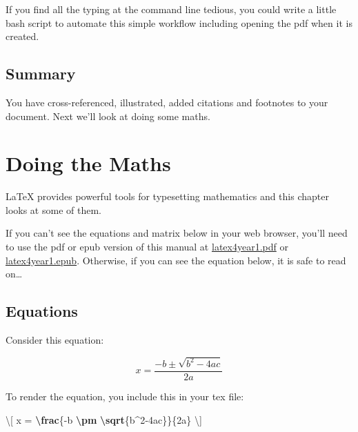 \documentclass[
]{book}
\newenvironment{Shaded}{\begin{snugshade}}{\end{snugshade}}
\newcommand{\SpecialCharTok}[1]{\textcolor[rgb]{0.81,0.36,0.00}{\textbf{#1}}}
\newcommand{\SpecialStringTok}[1]{\textcolor[rgb]{0.31,0.60,0.02}{#1}}
\begin{document}
If you find all the typing at the command line tedious, you could write a little bash script to automate this simple workflow including opening the pdf when it is created.

\section{Summary}\label{fingconc}

You have cross-referenced, illustrated, added citations and footnotes to your document. Next we'll look at doing some maths.

\chapter{Doing the Maths}\label{maths}

LaTeX provides powerful tools for typesetting mathematics and this chapter looks at some of them.

If you can't see the equations and matrix below in your web browser, you'll need to use the pdf or epub version of this manual at \href{https://latex4year1.netlify.app/latex4year1.pdf}{latex4year1.pdf} or \href{https://latex4year1.netlify.app/latex4year1.epub}{latex4year1.epub}. Otherwise, if you can see the equation below, it is safe to read on\ldots{}

\section{Equations}\label{equations}

Consider this equation:

\[ x = \frac{-b \pm \sqrt{b^2-4ac}}{2a} \]

To render the equation, you include this in your tex file:

\begin{Shaded}
\begin{Highlighting}[]
     \SpecialStringTok{\textbackslash{}[ x = }\SpecialCharTok{\textbackslash{}frac}\SpecialStringTok{\{{-}b }\SpecialCharTok{\textbackslash{}pm}\SpecialStringTok{ }\SpecialCharTok{\textbackslash{}sqrt}\SpecialStringTok{\{b\^{}2{-}4ac\}\}\{2a\} \textbackslash{}]}
\end{Highlighting}
\end{Shaded}
\end{document}
